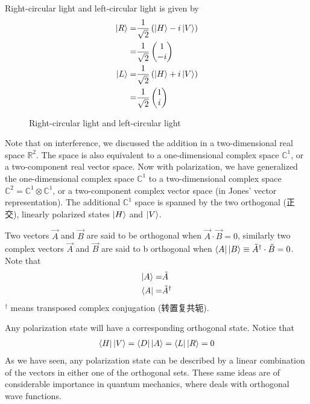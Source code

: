 Right-circular light and left-circular light is given by
\begin{align*}
    \ket{R}=&\frac{1}{\sqrt{2}}\left( \ket{H}-i\ket{V} \right)\\
    =&\frac{1}{\sqrt{2}}\begin{pmatrix}
        1\\-i
    \end{pmatrix}\\
    \ket{L}=&\frac{1}{\sqrt{2}}\left( \ket{H}+i\ket{V} \right)\\
    =&\frac{1}{\sqrt{2}}\begin{pmatrix}
        1\\i
    \end{pmatrix}
\end{align*}
\begin{figure}[H]
    \centering
    \caption{Right-circular light and left-circular light}
\end{figure}

Note that on interference, we discussed the addition in a two-dimensional real space $\mathbb{R}^2$. The space is also equivalent to a one-dimensional complex space $\mathbb{C}^1$, or a two-component real vector space. Now with polarization, we have generalized the one-dimensional complex space $\mathbb{C}^1$ to a two-dimensional complex space $\mathbb{C}^2=\mathbb{C}^1\otimes \mathbb{C}^1$, or a two-component complex vector space (in Jones' vector representation). The additional $\mathbb{C}^1$ space is spanned by the two orthogonal (正交), linearly polarized states $\ket{H}$ and $\ket{V}$. 

Two vectors $\vec{A}$ and $\vec{B}$ are said to be orthogonal when $\vec{A}\cdot\vec{B}=0$, similarly two complex vectors $\vec{A}$ and $\vec{B}$ are said to b orthogonal when $\bra{A} \ket{B} \equiv \tilde{A}^{\dagger }\cdot \tilde{B}=0$. Note that 
\begin{align*}
    \ket{A}=&\tilde{A}\\
    \bra{A}=&\tilde{A}^{\dagger}
\end{align*}
${}^{\dagger}$ means transposed complex conjugation (转置复共轭). 

Any polarization state will have a corresponding orthogonal state. Notice that
\begin{align*}
    \bra{H}\ket{V}=\bra{D}\ket{A}=\bra{L}\ket{R}=0
\end{align*}
As we have seen, any polarization state can be described by a linear combination of the vectors in either one of the orthogonal sets. These same ideas are of considerable importance in quantum mechanics, where deals with orthogonal wave functions. 

